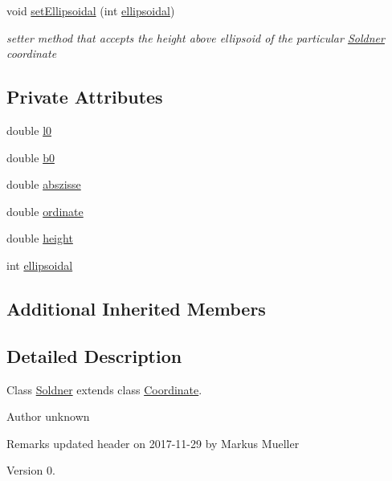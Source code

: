 \begin{DoxyCompactItemize}
void \hyperlink{classcoordinates_1_1_soldner_abf6ceb3d9b6edd741fdd05580b0593fa}{set\+Ellipsoidal} (int \hyperlink{classcoordinates_1_1_soldner_abef9061e0e316de4bba8f5e99292a2b5}{ellipsoidal})
\begin{DoxyCompactList}\small\item\em setter method that accepts the height above ellipsoid of the particular \hyperlink{classcoordinates_1_1_soldner}{Soldner} coordinate \end{DoxyCompactList}\end{DoxyCompactItemize}
\subsection*{Private Attributes}
\begin{DoxyCompactItemize}
\item 
double \hyperlink{classcoordinates_1_1_soldner_a4d8a0b1f4fce55f1d8be6433a2160b17}{l0}
\item 
double \hyperlink{classcoordinates_1_1_soldner_a489fa7e9e4c0c09e502bbbf2fb7ad689}{b0}
\item 
double \hyperlink{classcoordinates_1_1_soldner_ab1bec5d8a11e84c0cdc3154fd1abf843}{abszisse}
\item 
double \hyperlink{classcoordinates_1_1_soldner_ab13e1d9275b47a0754ed33c572dba57a}{ordinate}
\item 
double \hyperlink{classcoordinates_1_1_soldner_a4db9877edcf2391422fe532bd7131856}{height}
\item 
int \hyperlink{classcoordinates_1_1_soldner_abef9061e0e316de4bba8f5e99292a2b5}{ellipsoidal}
\end{DoxyCompactItemize}
\subsection*{Additional Inherited Members}


\subsection{Detailed Description}
Class \hyperlink{classcoordinates_1_1_soldner}{Soldner} extends class \hyperlink{classcoordinates_1_1_coordinate}{Coordinate}. 

\begin{DoxyAuthor}{Author}
unknown 
\end{DoxyAuthor}
\begin{DoxyRemark}{Remarks}
updated header on 2017-\/11-\/29 by Markus Mueller 
\end{DoxyRemark}
\begin{DoxyVersion}{Version}
0. 
\end{DoxyVersion}

